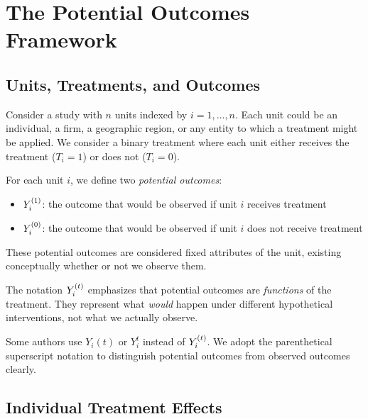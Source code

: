 \section{The Potential Outcomes Framework}
\label{sec:po_framework}

\subsection{Units, Treatments, and Outcomes}

Consider a study with $n$ units indexed by $i = 1, \ldots, n$. Each unit could be an individual, a firm, a geographic region, or any entity to which a treatment might be applied. We consider a binary treatment where each unit either receives the treatment ($T_i = 1$) or does not ($T_i = 0$).

\begin{definition}
\label{def:potential_outcomes}
For each unit $i$, we define two \emph{potential outcomes}:
\begin{itemize}
    \item $Y^{(1)}_i$: the outcome that would be observed if unit $i$ receives treatment
    \item $Y^{(0)}_i$: the outcome that would be observed if unit $i$ does not receive treatment
\end{itemize}
These potential outcomes are considered fixed attributes of the unit, existing conceptually whether or not we observe them.
\end{definition}

The notation $Y^{(t)}_i$ emphasizes that potential outcomes are \emph{functions} of the treatment. They represent what \emph{would} happen under different hypothetical interventions, not what we actually observe.

\begin{remark}
Some authors use $Y_i(t)$ or $Y_i^t$ instead of $Y^{(t)}_i$. We adopt the parenthetical superscript notation to distinguish potential outcomes from observed outcomes clearly.
\end{remark}

\subsection{Individual Treatment Effects}

